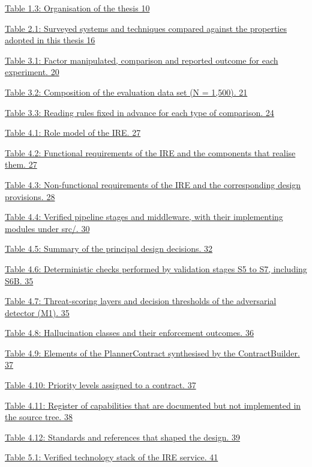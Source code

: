 \documentclass[
]{article}
\begin{document}
\protect\hyperlink{_Toc900024}{Table 1.3: Organisation of the thesis 10}

\protect\hyperlink{_Toc900036}{Table 2.1: Surveyed systems and
techniques compared against the properties adopted in this thesis 16}

\protect\hyperlink{_Toc900046}{Table 3.1: Factor manipulated, comparison
and reported outcome for each experiment. 20}

\protect\hyperlink{_Toc900048}{Table 3.2: Composition of the evaluation
data set (N = 1,500). 21}

\protect\hyperlink{_Toc900053}{Table 3.3: Reading rules fixed in advance
for each type of comparison. 24}

\protect\hyperlink{_Toc900060}{Table 4.1: Role model of the IRE. 27}

\protect\hyperlink{_Toc900062}{Table 4.2: Functional requirements of the
IRE and the components that realise them. 27}

\protect\hyperlink{_Toc900064}{Table 4.3: Non-functional requirements of
the IRE and the corresponding design provisions. 28}

\protect\hyperlink{_Toc900069}{Table 4.4: Verified pipeline stages and
middleware, with their implementing modules under src/. 30}

\protect\hyperlink{_Toc900073}{Table 4.5: Summary of the principal
design decisions. 32}

\protect\hyperlink{_Toc900083}{Table 4.6: Deterministic checks performed
by validation stages S5 to S7, including S6B. 35}

\protect\hyperlink{_Toc900085}{Table 4.7: Threat-scoring layers and
decision thresholds of the adversarial detector (M1). 35}

\protect\hyperlink{_Toc900087}{Table 4.8: Hallucination classes and
their enforcement outcomes. 36}

\protect\hyperlink{_Toc900090}{Table 4.9: Elements of the
PlannerContract synthesised by the ContractBuilder. 37}

\protect\hyperlink{_Toc900091}{Table 4.10: Priority levels assigned to a
contract. 37}

\protect\hyperlink{_Toc900094}{Table 4.11: Register of capabilities that
are documented but not implemented in the source tree. 38}

\protect\hyperlink{_Toc900097}{Table 4.12: Standards and references that
shaped the design. 39}

\protect\hyperlink{_Toc900102}{Table 5.1: Verified technology stack of
the IRE service. 41}
\end{document}
